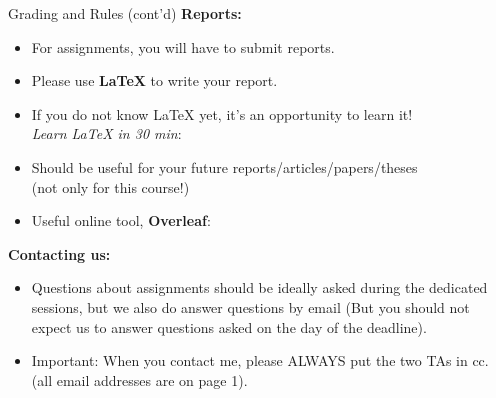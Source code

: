 \begin{frame}{Grading and Rules (cont'd)}
\textbf{Reports:}
\begin{itemize}
\item For assignments, you will have to submit reports.
\item Please use \textbf{LaTeX} to write your report.
\item If you do not know \LaTeX\,\,yet, it's an opportunity to learn it!\\
\vsp
\textit{Learn LaTeX in 30 min}: 
\item Should be useful for your future reports/articles/papers/theses\\ (not only for this course!)
\item Useful online tool, \textbf{Overleaf}: 
\end{itemize}
\vsp
\pause
\textbf{Contacting us:}
\begin{itemize}
\item Questions about assignments should be ideally asked during the dedicated sessions, but we also do answer questions by email (But you should not expect us to answer questions asked on the day of the deadline).
\item \alert{Important}: When you contact me, please ALWAYS put the two TAs in cc. (all email addresses are on page 1).
\end{itemize}
\end{frame}


